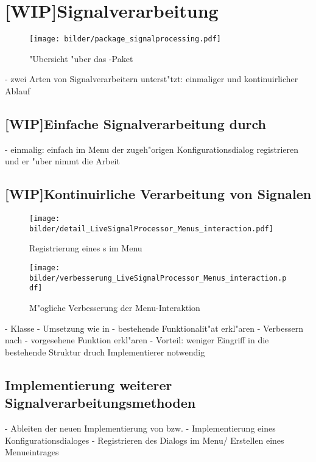 \section{[WIP]Signalverarbeitung}

\begin{figure}[htb]
\centering
\texttt{[image: bilder/package\_signalprocessing.pdf]}
\caption{"Ubersicht "uber das -Paket}
\label{pic:package_signalprocessing}
\end{figure}

- zwei Arten von Signalverarbeitern unterst"tzt: einmaliger und kontinuirlicher Ablauf

\subsection{[WIP]Einfache Signalverarbeitung durch }

- einmalig: einfach im Menu der zugeh"origen Konfigurationsdialog registrieren und er "uber nimmt die Arbeit

\subsection{[WIP]Kontinuirliche Verarbeitung von Signalen}

\begin{figure}[tbh]
\centering
\texttt{[image: bilder/detail\_LiveSignalProcessor\_Menus\_interaction.pdf]}
\caption{Registrierung eines s im Menu}
\label{pic:interaction_menu_lsp}
\end{figure}
\begin{figure}[tbh]
\centering
\texttt{[image: bilder/verbesserung\_LiveSignalProcessor\_Menus\_interaction.pdf]}
\caption{M"ogliche Verbesserung der Menu-Interaktion}
\label{pic:interaction_menu_lsp_improved}
\end{figure}

- Klasse 
- Umsetzung wie in 
- bestehende Funktionalit"at erkl"aren
- Verbessern nach 
- vorgesehene Funktion erkl"aren
- Vorteil: weniger Eingriff in die bestehende Struktur druch Implementierer notwendig

\subsection{Implementierung weiterer Signalverarbeitungsmethoden}

- Ableiten der neuen Implementierung von  bzw. 
- Implementierung eines Konfigurationsdialoges
- Registrieren des Dialogs im Menu/ Erstellen eines Menueintrages

